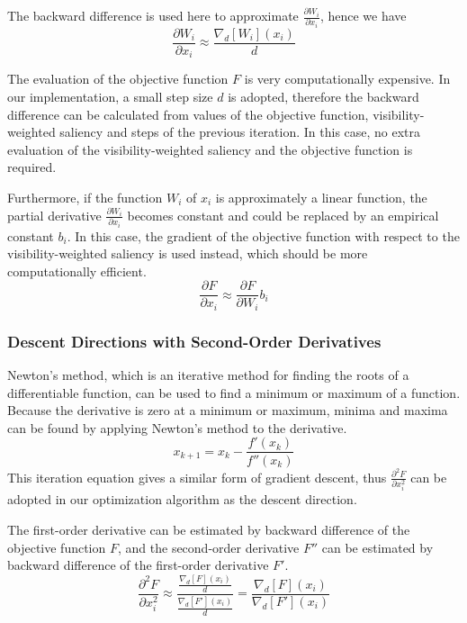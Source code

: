 The backward difference is used here to approximate $ \frac{\partial W_{i}}{\partial x_{i}} $, hence we have
\[ \frac{\partial W_{i}}{\partial x_{i}} \approx \frac{\nabla_{d}[W_{i}](x_{i})}{d} \]

The evaluation of the objective function $ F $ is very computationally expensive. In our implementation, a small step size $ d $ is adopted, therefore the backward difference can be calculated from values of the objective function, visibility-weighted saliency and steps of the previous iteration. In this case, no extra evaluation of the visibility-weighted saliency and the objective function is required.

Furthermore, if the function $ W_{i} $ of $ x_{i} $ is approximately a linear function, the partial derivative $ \frac{\partial W_{i}}{\partial x_{i}} $ becomes constant and could be replaced by an empirical constant $ b_{i} $. In this case, the gradient of the objective function with respect to the visibility-weighted saliency is used instead, which should be more computationally efficient.
\[ \frac{\partial F}{\partial x_{i}} \approx \frac{\partial F}{\partial W_{i}} b_{i} \]

\subsubsection{Descent Directions with Second-Order Derivatives}
Newton's method, which is an iterative method for finding the roots of a differentiable function, can be used to find a minimum or maximum of a function. Because the derivative is zero at a minimum or maximum, minima and maxima can be found by applying Newton's method to the derivative.
\[ x_{k+1}=x_{k}- \frac{f'(x_{k})}{f''(x_{k})} \]
This iteration equation gives a similar form of gradient descent, thus $ \frac{\partial^2 F}{\partial x_{i}^2} $ can be adopted in our optimization algorithm as the descent direction.

The first-order derivative can be estimated by backward difference of the objective function $ F $, and the second-order derivative $ F'' $ can be estimated by backward difference of the first-order derivative $ F' $.
\[ \frac{\partial^2 F}{\partial x_{i}^2} 
\approx \dfrac{ \frac{\nabla_{d}[F](x_{i})}{d} }{ \frac{\nabla_{d}[F'](x_{i})}{d} }
= \frac{ \nabla_{d}[F](x_{i}) }{ \nabla_{d}[F'](x_{i}) } \]

